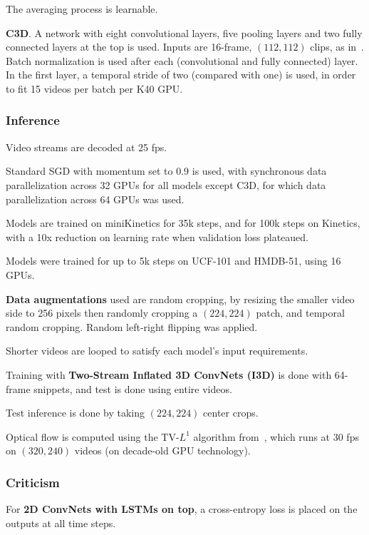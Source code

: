 \documentclass[a4paper, 12pt]{article}
\begin{document}
The averaging process is learnable.

\textbf{C3D}. A network with eight convolutional layers, five pooling layers
and two fully connected layers at the top is used. Inputs are 16-frame,
$(112, 112)$ clips, as in~\citet{DBLP:journals/corr/TranBFTP14}. Batch
normalization is used after each (convolutional and fully connected) layer. In
the first layer, a temporal stride of two (compared with one) is used, in order
to fit 15 videos per batch per K40 GPU\@.

\subsubsection{Inference}

Video streams are decoded at 25 fps.

Standard SGD with momentum set to 0.9 is used, with synchronous data
parallelization across 32 GPUs for all models except C3D, for which data
parallelization across 64 GPUs was used.

Models are trained on miniKinetics for 35k steps, and for 100k steps on
Kinetics, with a 10x reduction on learning rate when validation loss plateaued.

Models were trained for up to 5k steps on UCF-101 and HMDB-51, using 16 GPUs.

\textbf{Data augmentations} used are random cropping, by resizing the smaller
video side to 256 pixels then randomly cropping a $(224, 224)$ patch, and
temporal random cropping. Random left-right flipping was applied.

Shorter videos are looped to satisfy each model's input requirements.

Training with \textbf{Two-Stream Inflated 3D ConvNets (I3D)} is done with
64-frame snippets, and test is done using entire videos.

Test inference is done by taking $(224, 224)$ center crops.

Optical flow is computed using the TV-$L^1$ algorithm
from~\citet{Zach07aduality}, which runs at 30 fps on $(320, 240)$ videos (on
decade-old GPU technology).

\subsubsection{Criticism}

For \textbf{2D ConvNets with LSTMs on top}, a cross-entropy loss is placed on
the outputs at all time steps.
\end{document}
